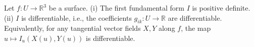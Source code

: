 Let $f: U \to \mathbb{R}^3$ be a surface.
(i) The first fundamental form $I$ is positive definite.
(ii) $I$ is differentiable, i.e., the coefficients $g_{ik}: U \to \mathbb{R}$ are differentiable. Equivalently, for any tangential vector fields $X, Y$ along $f$, the map $u \mapsto I_u(X(u), Y(u))$ is differentiable.